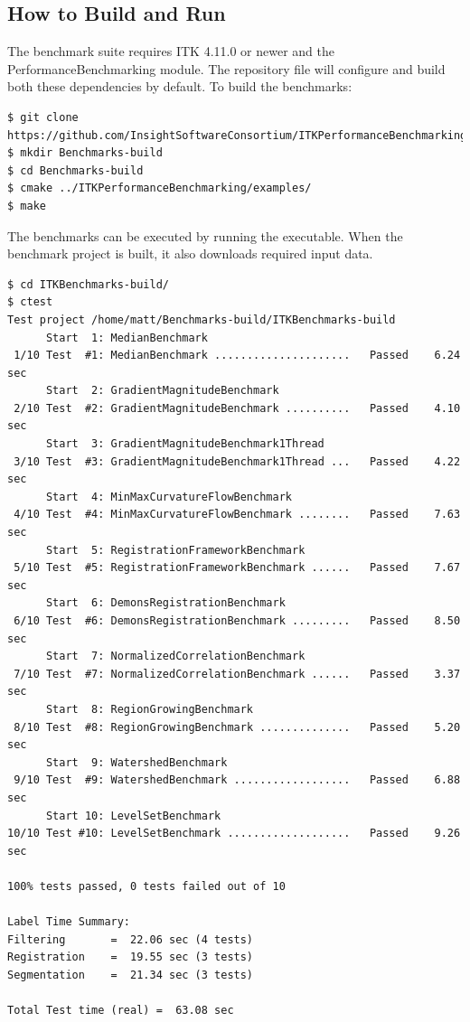 \documentclass{InsightArticle}
\begin{document}
\subsection{How to Build and Run}

The benchmark suite requires ITK 4.11.0 or newer and the
PerformanceBenchmarking module. The repository 
file will configure and build both these dependencies by default. To build the
benchmarks:

\small
\begin{verbatim}
$ git clone https://github.com/InsightSoftwareConsortium/ITKPerformanceBenchmarking
$ mkdir Benchmarks-build
$ cd Benchmarks-build
$ cmake ../ITKPerformanceBenchmarking/examples/
$ make
\end{verbatim}
\normalsize

The benchmarks can be executed by running the  executable. When
the benchmark project is built, it also downloads required input data.

\small
\begin{verbatim}
$ cd ITKBenchmarks-build/
$ ctest
Test project /home/matt/Benchmarks-build/ITKBenchmarks-build
      Start  1: MedianBenchmark
 1/10 Test  #1: MedianBenchmark .....................   Passed    6.24 sec
      Start  2: GradientMagnitudeBenchmark
 2/10 Test  #2: GradientMagnitudeBenchmark ..........   Passed    4.10 sec
      Start  3: GradientMagnitudeBenchmark1Thread
 3/10 Test  #3: GradientMagnitudeBenchmark1Thread ...   Passed    4.22 sec
      Start  4: MinMaxCurvatureFlowBenchmark
 4/10 Test  #4: MinMaxCurvatureFlowBenchmark ........   Passed    7.63 sec
      Start  5: RegistrationFrameworkBenchmark
 5/10 Test  #5: RegistrationFrameworkBenchmark ......   Passed    7.67 sec
      Start  6: DemonsRegistrationBenchmark
 6/10 Test  #6: DemonsRegistrationBenchmark .........   Passed    8.50 sec
      Start  7: NormalizedCorrelationBenchmark
 7/10 Test  #7: NormalizedCorrelationBenchmark ......   Passed    3.37 sec
      Start  8: RegionGrowingBenchmark
 8/10 Test  #8: RegionGrowingBenchmark ..............   Passed    5.20 sec
      Start  9: WatershedBenchmark
 9/10 Test  #9: WatershedBenchmark ..................   Passed    6.88 sec
      Start 10: LevelSetBenchmark
10/10 Test #10: LevelSetBenchmark ...................   Passed    9.26 sec

100% tests passed, 0 tests failed out of 10

Label Time Summary:
Filtering       =  22.06 sec (4 tests)
Registration    =  19.55 sec (3 tests)
Segmentation    =  21.34 sec (3 tests)

Total Test time (real) =  63.08 sec
\end{verbatim}
\normalsize
\end{document}

